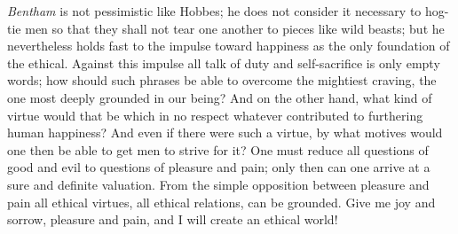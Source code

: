 \documentclass[12pt,a4paper,openany]{book}
\newcommand{\opage}[1]{\marginnote{\footnotesize\textit{[#1]}}}
\begin{document}
\emph{Bentham} is not pessimistic like Hobbes; he does not consider it
necessary to hog-tie men so that they shall not tear one another to pieces
like wild beasts; but he nevertheless holds fast to the impulse toward
happiness as the only foundation of the ethical. Against this impulse all talk
of duty and self-sacrifice is only empty words; how should such phrases be
able to overcome the mightiest craving, the one most deeply grounded in our
being? And on the other hand, what kind of virtue would that be which in no
respect whatever contributed to furthering human happiness? And even if there
were such a virtue, by what motives would one then be able to get men to
strive for it? One must reduce all questions of good and evil to questions of
pleasure and pain; only then can one arrive at a sure and definite valuation.
From the simple opposition between pleasure and pain \opage{24}all ethical
virtues, all ethical relations, can be grounded. Give me joy and sorrow,
pleasure and pain, and I will create an ethical world!
\end{document}
